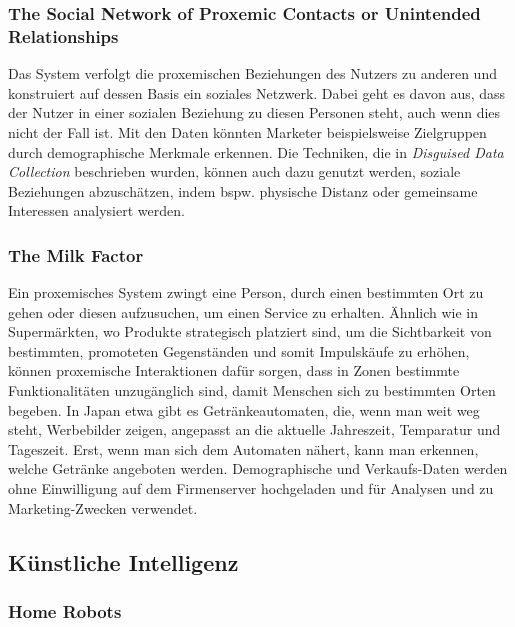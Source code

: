 \documentclass[a4paper]{article}
\begin{document}
\subsubsection{The Social Network of Proxemic Contacts or Unintended Relationships}
Das System verfolgt die proxemischen Beziehungen des Nutzers zu anderen und konstruiert auf dessen Basis ein soziales Netzwerk. Dabei geht es davon aus, dass der Nutzer in einer sozialen Beziehung zu diesen Personen steht, auch wenn dies nicht der Fall ist.\newline
Mit den Daten könnten Marketer beispielsweise Zielgruppen durch demographische Merkmale erkennen. Die Techniken, die in \textit{Disguised Data Collection} beschrieben wurden, können auch dazu genutzt werden, soziale Beziehungen abzuschätzen, indem bspw. physische Distanz oder gemeinsame Interessen analysiert werden.

\subsubsection{The Milk Factor}
Ein proxemisches System zwingt eine Person, durch einen bestimmten Ort zu gehen oder diesen aufzusuchen, um einen Service zu erhalten.\newline
Ähnlich wie in Supermärkten, wo Produkte strategisch platziert sind, um die Sichtbarkeit von bestimmten, promoteten Gegenständen und somit Impulskäufe zu erhöhen, können proxemische Interaktionen dafür sorgen, dass in Zonen bestimmte Funktionalitäten unzugänglich sind, damit Menschen sich zu bestimmten Orten begeben.\newline
In Japan etwa gibt es Getränkeautomaten, die, wenn man weit weg steht, Werbebilder zeigen, angepasst an die aktuelle Jahreszeit, Temparatur und Tageszeit. Erst, wenn man sich dem Automaten nähert, kann man erkennen, welche Getränke angeboten werden. Demographische und Verkaufs-Daten werden ohne Einwilligung auf dem Firmenserver hochgeladen und für Analysen und zu Marketing-Zwecken verwendet.


\subsection{Künstliche Intelligenz}
\label{sub:kuenstliche_intelligenz}

\subsubsection{Home Robots}
\label{sub:home_robots}
\end{document}
